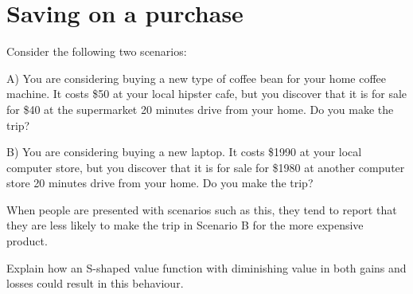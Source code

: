 \documentclass[
  letterpaper,
  DIV=11,
  numbers=noendperiod]{scrreprt}
\begin{document}
\hypertarget{saving-on-a-purchase}{%
\section{Saving on a purchase}\label{saving-on-a-purchase}}

Consider the following two scenarios:

A) You are considering buying a new type of coffee bean for your home
coffee machine. It costs \$50 at your local hipster cafe, but you
discover that it is for sale for \$40 at the supermarket 20 minutes
drive from your home. Do you make the trip?

B) You are considering buying a new laptop. It costs \$1990 at your
local computer store, but you discover that it is for sale for \$1980 at
another computer store 20 minutes drive from your home. Do you make the
trip?

When people are presented with scenarios such as this, they tend to
report that they are less likely to make the trip in Scenario B for the
more expensive product.

Explain how an S-shaped value function with diminishing value in both
gains and losses could result in this behaviour.
\end{document}
